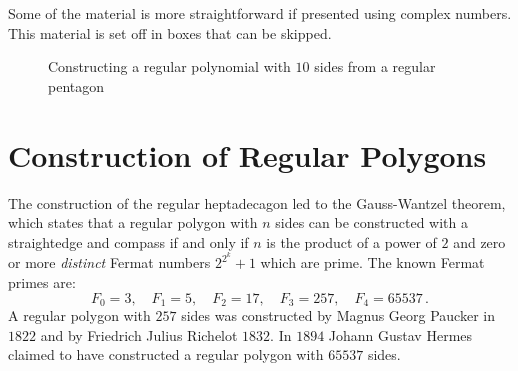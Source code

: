 Some of the material is more straightforward if presented using complex numbers. This material is set off in boxes that can be skipped.
\begin{figure}[b]
\begin{center}
\end{center}
\caption{Constructing a regular polynomial with $10$ sides from a regular pentagon}\label{f.hept-double}
\end{figure}

\section{Construction of Regular Polygons}\label{s.hept-regular}

The construction of the regular heptadecagon led to the Gauss-Wantzel theorem, which states that a regular polygon with $n$ sides can be constructed with a straightedge and compass if and only if $n$ is the product of a power of $2$ and zero or more \emph{distinct} Fermat numbers $2^{2^k}+1$ which are prime. The known Fermat primes are:
\[
F_0=3,\quad F_1=5,\quad F_2=17,\quad F_3=257,\quad F_4=65537\,.
\]
A regular polygon with $257$ sides was constructed by Magnus Georg Paucker in $1822$ and by Friedrich Julius Richelot $1832$. In $1894$ Johann Gustav Hermes claimed to have constructed a regular polygon  with $65537$ sides.

